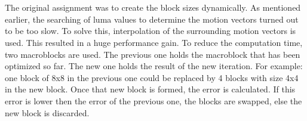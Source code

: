 \section[Give a description of the complexity reduction techniques you have introduced in Exercise 3.D. How did the result of the algorithm match with the expected behavior?
Can you describe other algorithms you did not implement?]{}
The original assignment was to create the block sizes dynamically. As mentioned earlier, the searching of luma values to determine the motion vectors turned out to be too slow. To solve this, interpolation of the surrounding motion vectors is used. This resulted in a huge performance gain.
\npar
To reduce the computation time, two macroblocks are used. The previous one holds the macroblock that has been optimized so far. The new one holds the result of the new iteration. For example: one block of 8x8 in the previous one could be replaced by 4 blocks with size 4x4 in the new block. Once that new block is formed, the error is calculated. If this error is lower then the error of the previous one, the blocks are swapped, else the new block is discarded. 
